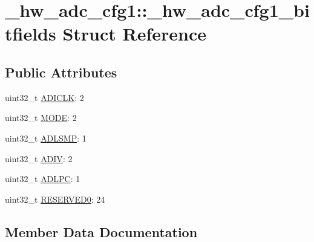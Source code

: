 \hypertarget{struct__hw__adc__cfg1_1_1__hw__adc__cfg1__bitfields}{}\section{\+\_\+hw\+\_\+adc\+\_\+cfg1\+:\+:\+\_\+hw\+\_\+adc\+\_\+cfg1\+\_\+bitfields Struct Reference}
\label{struct__hw__adc__cfg1_1_1__hw__adc__cfg1__bitfields}
\subsection*{Public Attributes}
\begin{DoxyCompactItemize}
\item 
uint32\+\_\+t \hyperlink{struct__hw__adc__cfg1_1_1__hw__adc__cfg1__bitfields_a1f3e0e8dc8cc5078e2aa72624cbf1aeb}{A\+D\+I\+C\+LK}\+: 2
\item 
uint32\+\_\+t \hyperlink{struct__hw__adc__cfg1_1_1__hw__adc__cfg1__bitfields_a5e7efe4e01650b23477f25c2c7f4493e}{M\+O\+DE}\+: 2
\item 
uint32\+\_\+t \hyperlink{struct__hw__adc__cfg1_1_1__hw__adc__cfg1__bitfields_a765571e3dc18c45f864323fdabf6729a}{A\+D\+L\+S\+MP}\+: 1
\item 
uint32\+\_\+t \hyperlink{struct__hw__adc__cfg1_1_1__hw__adc__cfg1__bitfields_afcde1a9bbd001e795665131c44e91d86}{A\+D\+IV}\+: 2
\item 
uint32\+\_\+t \hyperlink{struct__hw__adc__cfg1_1_1__hw__adc__cfg1__bitfields_a92962d15eb818c2071afb6911dbceb81}{A\+D\+L\+PC}\+: 1
\item 
uint32\+\_\+t \hyperlink{struct__hw__adc__cfg1_1_1__hw__adc__cfg1__bitfields_aced0e1db3a32dc2a9b64a1f0353f0cdd}{R\+E\+S\+E\+R\+V\+E\+D0}\+: 24
\end{DoxyCompactItemize}


\subsection{Member Data Documentation}
